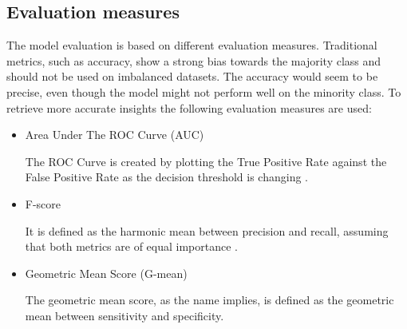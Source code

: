 \documentclass[parskip=full]{scrartcl}
\begin{document}

\subsection{Evaluation measures}

The model evaluation is based on different evaluation measures. Traditional metrics, such as accuracy, show a strong bias towards the majority class and should not be used on imbalanced datasets. The accuracy would seem to be precise, even though the model might not perform well on the minority class. To retrieve more accurate insights the following evaluation measures are used:

\begin{itemize}

	\renewcommand\labelitemi{--}

	\item Area Under The ROC Curve (AUC)
	
	The ROC Curve is created by plotting the True Positive Rate against the False Positive Rate as the decision threshold is changing \cite{Hand2009}.

	\item F-score
	
	It is defined as the harmonic mean between precision and recall, assuming that both metrics are of equal importance \cite{Guo2018}.

	\item Geometric Mean Score (G-mean)
	
	The geometric mean score, as the name implies, is defined as the geometric mean between sensitivity and specificity.

\end{itemize}
\end{document}
